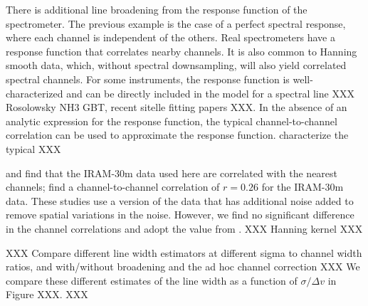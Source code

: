 \documentclass{rnaastex}
\begin{document}
There is additional line broadening from the response function of the spectrometer.  The previous example is the case of a perfect spectral response, where each channel is independent of the others.  Real spectrometers have a response function that correlates nearby channels.  It is also common to Hanning smooth data, which, without spectral downsampling, will also yield correlated spectral channels.  For some instruments, the response function is well-characterized and can be directly included in the model for a spectral line XXX Rosolowsky NH3 GBT, recent sitelle fitting papers XXX.  In the absence of an analytic expression for the response function, the typical channel-to-channel correlation can be used to approximate the response function. \citet{Leroy2016ApJ...831...16L} characterize the typical XXX

\citet{Leroy2016ApJ...831...16L} and \citet{Sun2018ApJ...860..172S} find that the IRAM-30m \cotwoone data used here are correlated with the nearest channels; \citet{Sun2018ApJ...860..172S} find a channel-to-channel correlation of $r=0.26$ for the IRAM-30m \cotwoone data.  These studies use a version of the data that has additional noise added to remove spatial variations in the noise.  However, we find no significant difference in the channel correlations and adopt the value from \citet{Sun2018ApJ...860..172S}. XXX Hanning kernel XXX

XXX Compare different line width estimators at different sigma to channel width ratios, and with/without broadening and the ad hoc channel correction XXX
We compare these different estimates of the line width as a function of $\sigma/\Delta v$ in Figure XXX. XXX
\end{document}
